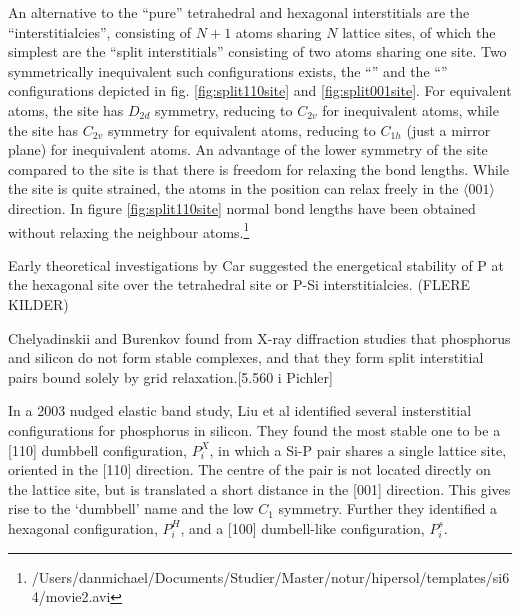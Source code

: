 \documentclass[11pt,bibliography=totoc,index=totoc]{scrbook}   %
\begin{document}
An alternative to the ``pure'' tetrahedral and hexagonal interstitials are the ``interstitialcies'', consisting of $N+1$ atoms sharing $N$ lattice sites, of which the simplest are the ``split interstitials'' consisting of two atoms sharing one site.
Two symmetrically inequivalent such configurations exists, the ``'' and the ``'' configurations depicted in fig. \ref{fig:split110site} and \ref{fig:split001site}.
For equivalent atoms, the  site has $D_{2d}$ symmetry, reducing to $C_{2v}$ for inequivalent atoms,
while the  site has $C_{2v}$ symmetry for equivalent atoms, reducing to $C_{1h}$ (just a mirror plane) for inequivalent atoms.
An advantage of the lower symmetry of the  site compared to the  site is that there is freedom for relaxing the bond lengths. 
While the  site is quite strained, the atoms in the  position can relax freely in the $\langle 001 \rangle$ direction. 
In figure \ref{fig:split110site} normal bond lengths have been obtained without relaxing the neighbour atoms.\footnote{
/Users/danmichael/Documents/Studier/Master/notur/hipersol/templates/si64/movie2.avi }



Early theoretical investigations by Car\cite{Car:1985} suggested the energetical stability of P at the hexagonal site over the tetrahedral site or P-Si interstitialcies. (FLERE KILDER)

Chelyadinskii and Burenkov found from X-ray diffraction studies that phosphorus and silicon do not form stable complexes, and that they form split interstitial pairs bound solely by grid relaxation.[5.560 i Pichler]

In a 2003 nudged elastic band study, Liu et al identified several insterstitial configurations for phosphorus in silicon.
They found the most stable one to be a [110] dumbbell configuration, $P_i^X$, in which a Si-P pair shares a single lattice site, oriented in the [110] direction. The centre of the pair is not located directly on the lattice site, but is translated a short distance in the [001] direction. This gives rise to the `dumbbell' name and the low $C_1$ symmetry.
Further they identified a hexagonal configuration, $P_i^H$, and a [100] dumbell-like configuration, $P_i^s$.


\end{document}
